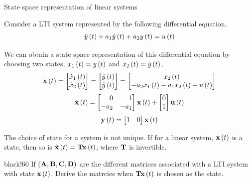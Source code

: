 \documentclass[aspectratio=169]{beamer}
\def\mf{\ensuremath\mathbf}
\def\lp{\ensuremath\left(}
\def\rp{\ensuremath\right)}
\def\bmx{\ensuremath\begin{bmatrix*}[r]}
\def\emx{\ensuremath\end{bmatrix*}}
\def\bmxc{\ensuremath\begin{bmatrix*}[c]}
\newcommand{\demoex}[2]{\onslide<#1->\begin{color}{black!60} #2 \end{color}}
\newcommand{\ct}[1]{\lp #1\rp}
\begin{document}
\begin{frame}{State space representation of linear systems}
\begin{small}
Consider a LTI system represented by the following differential equation,
\[ \ddot{y}\ct{t} + a_1\dot{y}\ct{t} + a_2 y\ct{t} = u\ct{t} \]

We can obtain a state space representation of this differential equation by choosing two states, $x_1\ct{t} = y\ct{t}$ and $x_2\ct{t} = \dot{y}\ct{t}$,
\[ \dot{\mf{x}}\ct{t} = \bmx \dot{x}_1\ct{t}\\ \dot{x}_2\ct{t} \emx = \bmx \dot{y}\ct{t}\\ \ddot{y}\ct{t} \emx = \bmxc x_2\ct{t}\\ -a_2x_1\ct{t} -a_1x_2\ct{t} + u\ct{t} \emx \]  
\[ \dot{\mf{x}}\ct{t} = \bmx 0 & 1 \\ -a_2 & -a_1\emx \mf{x}\ct{t} + \bmx 0 \\ 1\emx \mf{u}\ct{t} \]
\[ \mf{y}\ct{t} = \bmx 1 & 0 \emx \mf{x}\ct{t} \]

The choice of state for a system is not unique. If for a linear system, $\mf{x}\ct{t}$ is a state, then so is $\hat{\mf{x}}\ct{t} = \mf{T}\mf{x}\ct{t}$, where $\mf{T}$ is invertible.

\demoex{2}{
If $\lp \mf{A}, \mf{B}, \mf{C}, \mf{D}\rp$ are the different matrices associated with a LTI system with state $\mf{x}\ct{t}$. Derive the matrcies when $\mf{T}\mf{x}\ct{t}$ is chosen as the state.}
\end{small}
\end{frame}
\end{document}
